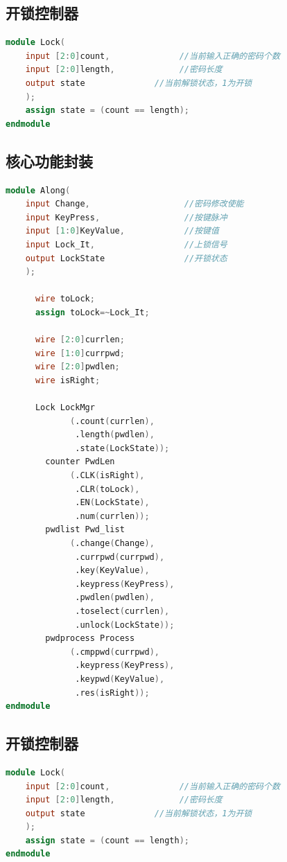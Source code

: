\documentclass[a4paper,11pt]{ctexart}
\begin{document}
\subsection{开锁控制器}
\begin{lstlisting}[language={verilog}]
module Lock(
    input [2:0]count,              //当前输入正确的密码个数
    input [2:0]length,             //密码长度
    output state              //当前解锁状态，1为开锁
    );
    assign state = (count == length);
endmodule
\end{lstlisting}
\subsection{核心功能封装}
\begin{lstlisting}[language={verilog}]
module Along(
    input Change,                   //密码修改使能
    input KeyPress,                 //按键脉冲
    input [1:0]KeyValue,            //按键值
    input Lock_It,                  //上锁信号
    output LockState                //开锁状态
    );

      wire toLock;
      assign toLock=~Lock_It;

      wire [2:0]currlen;
      wire [1:0]currpwd;
      wire [2:0]pwdlen;
      wire isRight;

      Lock LockMgr
             (.count(currlen),
              .length(pwdlen),
              .state(LockState));
        counter PwdLen
             (.CLK(isRight),
              .CLR(toLock),
              .EN(LockState),
              .num(currlen));
        pwdlist Pwd_list
             (.change(Change),
              .currpwd(currpwd),
              .key(KeyValue),
              .keypress(KeyPress),
              .pwdlen(pwdlen),
              .toselect(currlen),
              .unlock(LockState));
        pwdprocess Process
             (.cmppwd(currpwd),
              .keypress(KeyPress),
              .keypwd(KeyValue),
              .res(isRight));
endmodule
\end{lstlisting}

\subsection{开锁控制器}
\begin{lstlisting}[language={verilog}]
module Lock(
    input [2:0]count,              //当前输入正确的密码个数
    input [2:0]length,             //密码长度
    output state              //当前解锁状态，1为开锁
    );
    assign state = (count == length);
endmodule
\end{lstlisting}
\end{document}
